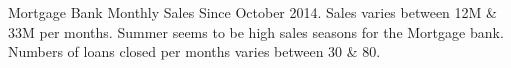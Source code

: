 \documentclass[11pt]{article}
\begin{document}
    \begin{center}
    \end{center}
    { \hspace*{\fill} \\}
    
    \begin{center}
    \end{center}
    { \hspace*{\fill} \\}
    
Mortgage Bank Monthly Sales Since October 2014. Sales varies between 12M & 33M per months. Summer seems to be high sales seasons for the Mortgage bank.
Numbers of loans closed per months varies between 30 & 80.
\end{document}
